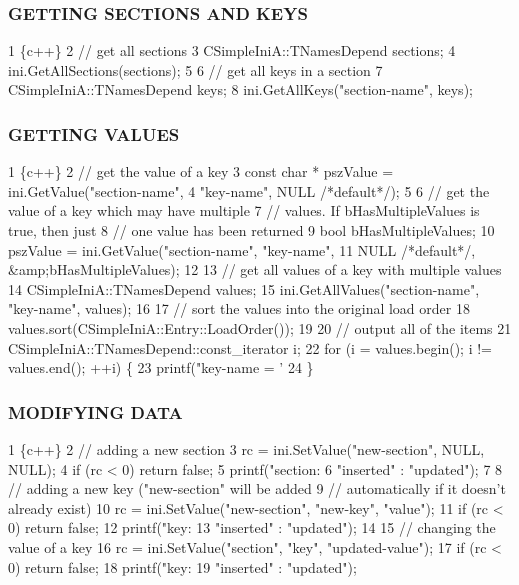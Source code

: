\subsubsection*{G\+E\+T\+T\+I\+N\+G S\+E\+C\+T\+I\+O\+N\+S A\+N\+D K\+E\+Y\+S}


\begin{DoxyCode}
1 \{c++\}
2 // get all sections
3 CSimpleIniA::TNamesDepend sections;
4 ini.GetAllSections(sections);
5 
6 // get all keys in a section
7 CSimpleIniA::TNamesDepend keys;
8 ini.GetAllKeys("section-name", keys);
\end{DoxyCode}


\subsubsection*{G\+E\+T\+T\+I\+N\+G V\+A\+L\+U\+E\+S}


\begin{DoxyCode}
1 \{c++\}
2 // get the value of a key
3 const char * pszValue = ini.GetValue("section-name", 
4     "key-name", NULL /*default*/);
5 
6 // get the value of a key which may have multiple 
7 // values. If bHasMultipleValues is true, then just 
8 // one value has been returned
9 bool bHasMultipleValues;
10 pszValue = ini.GetValue("section-name", "key-name", 
11     NULL /*default*/, &amp;bHasMultipleValues);
12 
13 // get all values of a key with multiple values
14 CSimpleIniA::TNamesDepend values;
15 ini.GetAllValues("section-name", "key-name", values);
16 
17 // sort the values into the original load order
18 values.sort(CSimpleIniA::Entry::LoadOrder());
19 
20 // output all of the items
21 CSimpleIniA::TNamesDepend::const\_iterator i;
22 for (i = values.begin(); i != values.end(); ++i) \{ 
23     printf("key-name = '%
24 \}
\end{DoxyCode}


\subsubsection*{M\+O\+D\+I\+F\+Y\+I\+N\+G D\+A\+T\+A}


\begin{DoxyCode}
1 \{c++\}
2 // adding a new section
3 rc = ini.SetValue("new-section", NULL, NULL);
4 if (rc < 0) return false;
5 printf("section: %
6     "inserted" : "updated");
7 
8 // adding a new key ("new-section" will be added 
9 // automatically if it doesn't already exist)
10 rc = ini.SetValue("new-section", "new-key", "value");
11 if (rc < 0) return false;
12 printf("key: %
13     "inserted" : "updated");
14 
15 // changing the value of a key
16 rc = ini.SetValue("section", "key", "updated-value");
17 if (rc < 0) return false;
18 printf("key: %
19     "inserted" : "updated");
\end{DoxyCode}


